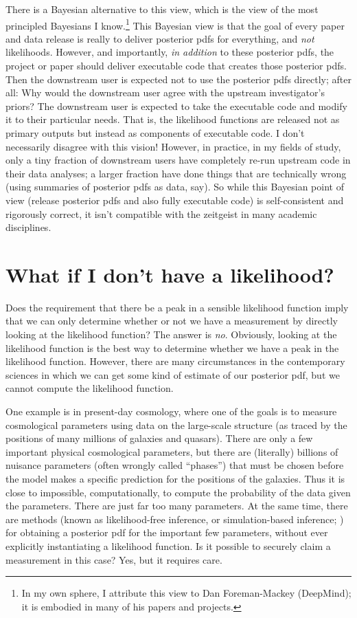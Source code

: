 \documentclass{article}
\begin{document}
There is a Bayesian alternative to this view, which is the view of the most principled Bayesians I know.\footnote{In my own sphere, I attribute this view to Dan Foreman-Mackey (DeepMind); it is embodied in many of his papers and projects.}
This Bayesian view is that the goal of every paper and data release is really to deliver posterior pdfs for everything, and \emph{not} likelihoods.
However, and importantly, \emph{in addition} to these posterior pdfs, the project or paper should deliver executable code that creates those posterior pdfs.
Then the downstream user is expected not to use the posterior pdfs directly; after all:
Why would the downstream user agree with the upstream investigator's priors?
The downstream user is expected to take the executable code and modify it to their particular needs.
That is, the likelihood functions are released not as primary outputs but instead as components of executable code.
I don't necessarily disagree with this vision!
However, in practice, in my fields of study, only a tiny fraction of downstream users have completely re-run upstream code in their data analyses; a larger fraction have done things that are technically wrong (using summaries of posterior pdfs as data, say).
So while this Bayesian point of view (release posterior pdfs and also fully executable code) is self-consistent and rigorously correct, it isn't compatible with the zeitgeist in many academic disciplines.

\section{What if I don't have a likelihood?}\label{sec:lfi}
Does the requirement that there be a peak in a sensible likelihood function imply that we can only determine whether or not we have a measurement by directly looking at the likelihood function?
The answer is \emph{no}.
Obviously, looking at the likelihood function is the best way to determine whether we have a peak in the likelihood function.
However, there are many circumstances in the contemporary sciences in which we can get some kind of estimate of our posterior pdf, but we cannot compute the likelihood function.

One example is in present-day cosmology, where one of the goals is to measure cosmological parameters using data on the large-scale structure (as traced by the positions of many millions of galaxies and quasars).
There are only a few important physical cosmological parameters, but there are (literally) billions of nuisance parameters (often wrongly called ``phases'') that must be chosen before the model makes a specific prediction for the positions of the galaxies.
Thus it is close to impossible, computationally, to compute the probability of the data given the parameters.
There are just far too many parameters.
At the same time, there are methods (known as likelihood-free inference, or simulation-based inference; \cite{abc, sbi}) for obtaining a posterior pdf for the important few parameters, without ever explicitly instantiating a likelihood function.
Is it possible to securely claim a measurement in this case?
Yes, but it requires care.
\end{document}
